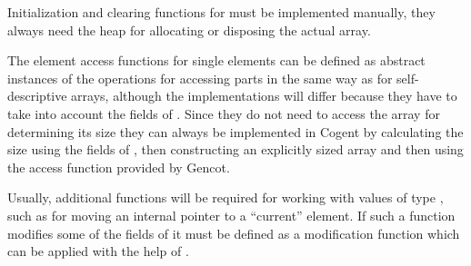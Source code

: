 Initialization and clearing functions for  must be implemented manually, they always need the
heap for allocating or disposing the actual array. 

The element access functions for single elements can be defined as abstract instances of the operations for accessing parts 
in the same way as for self-descriptive arrays, although the implementations will differ because they have to 
take into account the fields of . Since they do not need to access the array for determining its size
they can always be implemented in Cogent by calculating the size using the fields of , then constructing
an explicitly sized array and then using the access function provided by Gencot.

Usually, additional functions will be required for working
with values of type , such as for moving an internal pointer to a ``current'' element.
If such a function modifies some of the fields of  it must be defined as a modification function
which can be applied with the help of .
